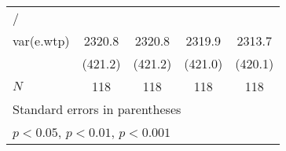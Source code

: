 {\begin{tabular}{l*{4}{c}}
\hline
/         &                  &                  &                  &                  \\
var(e.wtp)&   2320.8\sym{***}&   2320.8\sym{***}&   2319.9\sym{***}&   2313.7\sym{***}\\
          &  (421.2)         &  (421.2)         &  (421.0)         &  (420.1)         \\
\hline
\(N\)     &      118         &      118         &      118         &      118         \\
\hline\hline
\multicolumn{5}{l}{\footnotesize Standard errors in parentheses}\\
\multicolumn{5}{l}{\footnotesize \sym{*} \(p<0.05\), \sym{**} \(p<0.01\), \sym{***} \(p<0.001\)}\\
\end{tabular}
}
